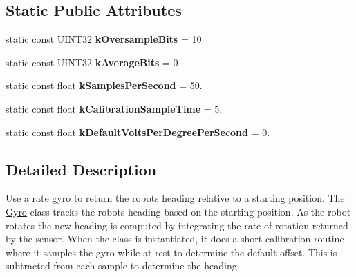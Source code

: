 \subsection*{\-Static \-Public \-Attributes}
\begin{DoxyCompactItemize}
\item 
\hypertarget{classGyro_aa5a4a22bd8b619a7ebb221b9412a1597}{static const \-U\-I\-N\-T32 {\bfseries k\-Oversample\-Bits} = 10}\label{classGyro_aa5a4a22bd8b619a7ebb221b9412a1597}

\item 
\hypertarget{classGyro_a491e633f55680ff58d8dd8fde169dc8b}{static const \-U\-I\-N\-T32 {\bfseries k\-Average\-Bits} = 0}\label{classGyro_a491e633f55680ff58d8dd8fde169dc8b}

\item 
\hypertarget{classGyro_a64c71dccfd49e35c8723be4d3471029c}{static const float {\bfseries k\-Samples\-Per\-Second} = 50.}\label{classGyro_a64c71dccfd49e35c8723be4d3471029c}

\item 
\hypertarget{classGyro_a97cf14846097a6daf64f25955addb347}{static const float {\bfseries k\-Calibration\-Sample\-Time} = 5.}\label{classGyro_a97cf14846097a6daf64f25955addb347}

\item 
\hypertarget{classGyro_ae668f3598a0f225fb68b820888e66f3a}{static const float {\bfseries k\-Default\-Volts\-Per\-Degree\-Per\-Second} = 0.}\label{classGyro_ae668f3598a0f225fb68b820888e66f3a}

\end{DoxyCompactItemize}


\subsection{\-Detailed \-Description}
\-Use a rate gyro to return the robots heading relative to a starting position. \-The \hyperlink{classGyro}{\-Gyro} class tracks the robots heading based on the starting position. \-As the robot rotates the new heading is computed by integrating the rate of rotation returned by the sensor. \-When the class is instantiated, it does a short calibration routine where it samples the gyro while at rest to determine the default offset. \-This is subtracted from each sample to determine the heading. 

